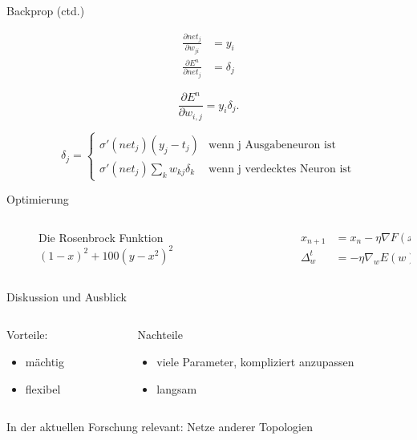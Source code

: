 \documentclass[10pt, compress, xetex]{beamer}
\begin{document}
\begin{frame}{Backprop (ctd.)}


\begin{align}
  \frac{\partial net_j }{\partial w_{ji}} & =  y_i
  \\
  \frac{\partial E^n}{\partial net_j} & =  \delta_j
\end{align}

\begin{equation}
\label{eq:evaluate}
  \frac{\partial E^n}{\partial w_{i,j}} = y_i  \delta_j.
\end{equation}

\begin{equation}
\label{eq:backpropagation}
\delta_j =  \begin{cases}
               \sigma ' (net_j) (y_j - t_j)           & \text{wenn j Ausgabeneuron ist}\\
               \sigma ' (net_j) \sum_k w_{kj} \delta_k     & \text{wenn j verdecktes Neuron ist}
           \end{cases} 
\end{equation} 
\end{frame}
\begin{frame}{Optimierung}


\begin{columns}[c]
  \begin{column}[c]{.3\textwidth}
  \begin{figure}[ht!]
  \centering
  \caption{Die Rosenbrock Funktion $(1-x)^2 + 100(y - x^2)^2$}

\end{figure}
  \end{column}  
  \begin{column}[c]{.7\textwidth}
    \begin{align}
    x_{n+1} &=x_n- \eta  \nabla F(x_n) \\
    \Delta_w^t &= - \eta  \nabla_w E(w)
    \end{align}
    \end{column}
\end{columns} 
\end{frame}

\begin{frame}{Diskussion und Ausblick}
\begin{columns}[T]
  \begin{column}[T]{.5\textwidth}
        Vorteile:
        \begin{itemize}
          \item mächtig
          \item flexibel
        \end{itemize}
  \end{column}  
  \begin{column}[T]{.5\textwidth}
        Nachteile
        \begin{itemize}
          \item viele Parameter, kompliziert anzupassen
          \item langsam
        \end{itemize}
    \end{column}
\end{columns} 
In der \alert{aktuellen} Forschung relevant: Netze anderer Topologien 
\end{frame}
\end{document}
